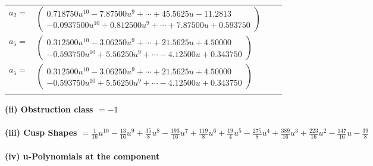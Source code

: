 \documentclass[1p]{elsarticle_modified}
\theoremstyle{definition}
\begin{document}
\begin{tabular}{m{7pt} m{180pt} m{7pt} m{180pt} }
\flushright $a_{2}=$&$\begin{pmatrix}0.718750 u^{10}-7.87500 u^{9}+\cdots+45.5625 u-11.2813\\-0.0937500 u^{10}+0.812500 u^{9}+\cdots+7.87500 u+0.593750\end{pmatrix}$ \\
\flushright $a_{5}=$&$\begin{pmatrix}0.312500 u^{10}-3.06250 u^{9}+\cdots+21.5625 u+4.50000\\-0.593750 u^{10}+5.56250 u^{9}+\cdots-4.12500 u+0.343750\end{pmatrix}$\\ \flushright $a_{5}=$&$\begin{pmatrix}0.312500 u^{10}-3.06250 u^{9}+\cdots+21.5625 u+4.50000\\-0.593750 u^{10}+5.56250 u^{9}+\cdots-4.12500 u+0.343750\end{pmatrix}$\\&\end{tabular}
\flushleft \textbf{(ii) Obstruction class $= -1$}\\~\\
\flushleft \textbf{(iii) Cusp Shapes $= \frac{1}{16} u^{10}-\frac{13}{16} u^9+\frac{35}{8} u^8-\frac{193}{16} u^7+\frac{119}{8} u^6+\frac{19}{4} u^5-\frac{275}{8} u^4+\frac{389}{16} u^3+\frac{223}{16} u^2-\frac{147}{16} u-\frac{39}{8}$}\\~\\
\newpage\renewcommand{\arraystretch}{1}
\flushleft \textbf{(iv) u-Polynomials at the component}\newline \\
\end{document}
